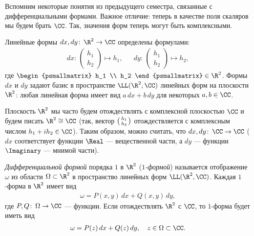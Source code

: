 Вспомним некоторые понятия из предыдущего семестра, связанные с дифференциальными формами. Важное отличие: теперь в качестве поля скаляров мы будем брать $\CC$. Так, значения форм теперь могут быть комплексными.
\begin{df*}
 Линейные формы $dx, dy \colon\, \R^{2} \to \CC$ определены формулами:
 \begin{align*}
  dx \colon\, \begin{pmatrix}
   h_1 \\ h_2
  \end{pmatrix} \mapsto h_1, & &dy \colon\, \begin{pmatrix}
   h_1 \\ h_2
  \end{pmatrix} \mapsto h_2,
 \end{align*} где $ \begin{psmallmatrix}
  h_1 \\ h_2
 \end{psmallmatrix} \in \R^{2}$. Формы $dx$ и $dy$ задают базис в пространстве $\LL(\R^{2}, \CC)$ линейных форм на плоскости $\R^{2}$: любая линейная форма имеет вид $a \, dx + b \, dy$ для некоторых $a,b \in \CC$.

 Плоскость $\R^{2}$ мы часто будем отождествлять с комплексной плоскостью $\CC$ и будем писать $\R^{2} \cong \CC$ (так, вектор $ \begin{psmallmatrix}
  h_1 \\ h_2
 \end{psmallmatrix}$ отождествляется с комплексным числом $h_1 + i h_2 \in \CC$). Таким образом, можно считать, что $dx, dy \colon\, \CC \to \CC$ ($dx$ соответствует функции $\Real$ --- вещественной части, а $dy$ --- функции $\Imaginary$ --- мнимой части).
 \end{df*}

 \begin{df*}
 \textit{Дифференциальной формой} порядка $1$ в $\R^{2}$ (\textit{$1$-формой}) называется отображение $\omega$ из области $\Omega \subset \R^{2}$ в пространство линейных форм $\LL(\R^{2}, \CC)$. Каждая $1$-форма в $\R^{2}$ имеет вид
 \begin{align}
  \label{equation:1-form}
  \omega = P(x,y)\,dx + Q(x,y)\,dy
 ,\end{align} где $P, Q \colon\, \Omega \to \CC$ --- функции. Если отождествлять $\R^{2}$ с $\CC$, то $1$-форма будет иметь вид
 \begin{align*}
  \omega = P(z)\,dx + Q(z)\,dy, \quad z \in \Omega \subset \CC
 .\end{align*} 
\end{df*}

